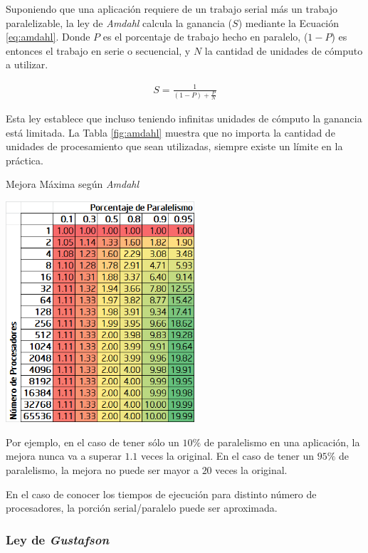 \documentclass[a4paper]{report}
\begin{document}
\bigskip

Suponiendo que una aplicación requiere de un trabajo serial más un trabajo paralelizable, la ley de {\it Amdahl} calcula la ganancia ($ S $) mediante la Ecuación \ref{eq:amdahl}.
Donde $ P $ es el porcentaje de trabajo hecho en paralelo, ($ 1-P $) es entonces el trabajo en serie o secuencial, y $ N $ la cantidad de unidades de cómputo a utilizar.

\begin{eqnarray}
\label{eq:amdahl}
S = \frac{1}{(1 - P) + \frac{P}{N}}
\end{eqnarray}

Esta ley establece que incluso teniendo infinitas unidades de cómputo la ganancia está limitada.
La Tabla \ref{fig:amdahl} muestra que no importa la cantidad de unidades de procesamiento que sean utilizadas, siempre existe un límite en la práctica.

\begin{table}[H]
\caption{Mejora Máxima según {\it Amdahl}}
\centering
\includegraphics[width=7cm]{amdahl.png}

\label{fig:amdahl}
\end{table}

Por ejemplo, en el caso de tener sólo un $ 10\% $ de paralelismo en una aplicación, la mejora nunca va a superar $ 1.1 $ veces la original.
En el caso de tener un $ 95\% $ de paralelismo, la mejora no puede ser mayor a $ 20 $ veces la original.

\bigskip

En el caso de conocer los tiempos de ejecución para distinto número de procesadores, la porción serial/paralelo puede ser aproximada.

\subsubsection{Ley de {\it Gustafson}}
\end{document}
